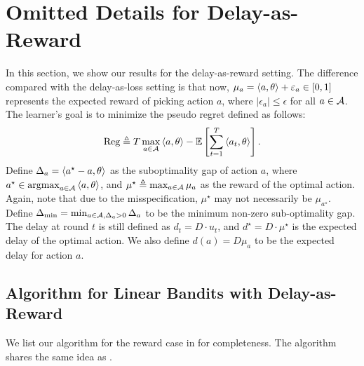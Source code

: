 \section{Omitted Details for Delay-as-Reward}\label{app: reward}
In this section, we show our results for the delay-as-reward setting. The difference compared with the delay-as-loss setting is that now, $\mu_a=\left\langle {a,\theta} \right\rangle+\varepsilon_a\in[0,1]$ represents the expected reward of picking action $a$, where $|\epsilon_a|\leq \epsilon$ for all $a\in{\mathcal{A}}$. The learner's goal is to minimize the pseudo regret defined as follows:
\begin{align}\label{eqn:reward-regret}
    {\mathrm{Reg}}\triangleq T\max_{a\in{\mathcal{A}}}\left\langle {a,\theta} \right\rangle - \mathbb{E}\left[\sum_{t=1}^T\left\langle {a_t,\theta} \right\rangle\right].
\end{align}
 Define $\Delta_a = \left\langle {a^\star-a,\theta} \right\rangle$ as the suboptimality gap of action $a$, where $a^\star \in \operatorname*{argmax}_{a\in{\mathcal{A}}}\left\langle {a, \theta} \right\rangle$, and $\mu^\star \triangleq \max_{a\in{\mathcal{A}}}\mu_a$ as the reward of the optimal action. Again, note that due to the misspecification, $\mu^\star$ may not necessarily be $\mu_{a^\star}$. Define $\Delta_{\min} = \min_{a\in {\mathcal{A}}, \Delta_a>0}\Delta_a$ to be the minimum non-zero sub-optimality gap. The delay at round $t$ is still defined as $d_t=D\cdot u_t$, and $d^\star = D\cdot \mu^\star$ is  the expected delay of the optimal action. We also define $d(a)=D\mu_a$ to be the expected delay for action $a$.

\newpage
\subsection{Algorithm for Linear Bandits with Delay-as-Reward}
We list our algorithm for the reward case in  for completeness. The algorithm shares the same idea as .

